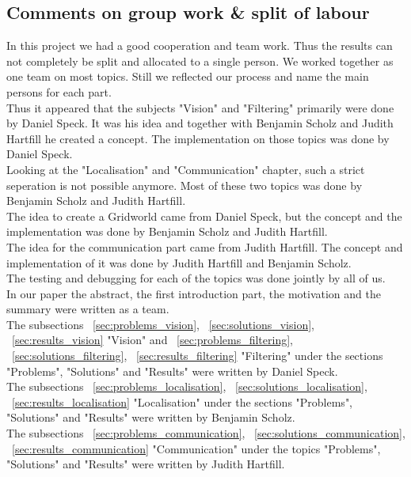 \documentclass[lnicst,a4paper]{svmultln}
\begin{document}
\subsection{Comments on group work \& split of labour}
In this project we had a good cooperation and team work. Thus the results can not completely be split and allocated to a single person. We worked together as one team on most topics. Still we reflected our process and name the main persons for each part.
\\
Thus it appeared that the subjects "Vision" and "Filtering" primarily were done by Daniel Speck. It was his idea and together with Benjamin Scholz and Judith Hartfill he created a concept. The implementation on those topics was done by Daniel Speck.
\\
Looking at the "Localisation" and "Communication" chapter, such a strict seperation is not possible anymore. Most of these two topics was done by Benjamin Scholz and Judith Hartfill.
\\
The idea to create a Gridworld came from Daniel Speck, but the concept and the implementation was done by Benjamin Scholz and Judith Hartfill.
\\
The idea for the communication part came from Judith Hartfill. The concept and implementation of it was done by Judith Hartfill and Benjamin Scholz. 
\\
The testing and debugging for each of the topics was done jointly by all of us.
\\
In our paper the abstract, the first introduction part, the motivation and the summary were written as a team.
\\
The subsections ~\ref{sec:problems_vision}, ~\ref{sec:solutions_vision}, ~\ref{sec:results_vision} "Vision" and ~\ref{sec:problems_filtering}, ~\ref{sec:solutions_filtering}, ~\ref{sec:results_filtering} "Filtering" under the sections "Problems", "Solutions" and "Results" were written by Daniel Speck.
\\
The subsections ~\ref{sec:problems_localisation}, ~\ref{sec:solutions_localisation}, ~\ref{sec:results_localisation} "Localisation" under the sections "Problems", "Solutions" and "Results" were written by Benjamin Scholz.
\\
The subsections ~\ref{sec:problems_communication}, ~\ref{sec:solutions_communication}, ~\ref{sec:results_communication} "Communication" under the topics "Problems", "Solutions" and "Results" were written by Judith Hartfill.
\end{document}
